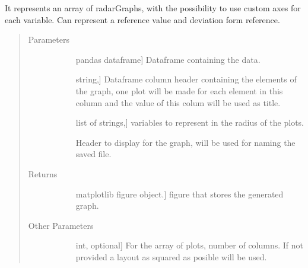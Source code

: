 \documentclass[letterpaper,10pt,english]{sphinxmanual}
\begin{document}
\begin{fulllineitems}
\label{\detokenize{rstFiles/radarArray:radarArray.radarArrayGraph}}
It represents an array of radarGraphs, 
with the possibility to use custom axes for each variable. 
Can represent a reference value and deviation form reference.
\begin{quote}\begin{description}
\item[{Parameters}] \leavevmode\begin{description}
\item[{}] \leavevmode{[}pandas dataframe{]}
Dataframe containing the data.

\item[{}] \leavevmode{[}string,{]}
Dataframe column header containing 
the elements of the graph, 
one plot will be made for each element in this column 
and the value of this colum will be used as title.

\item[{}] \leavevmode{[}list of strings,{]}
variables to represent in the radius of the plots.

\item[{}] \leavevmode
Header to display for the graph, 
will be used for naming the saved file.

\end{description}

\item[{Returns}] \leavevmode\begin{description}
\item[{}] \leavevmode{[}matplotlib figure object.{]}
figure that stores the generated graph.

\end{description}

\item[{Other Parameters}] \leavevmode\begin{description}
\item[{}] \leavevmode{[}int, optional{]}
For the array of plots, number of columns. 
If not provided a layout as squared as posible will be used.


\end{description}
\end{description}
\end{quote}
\end{fulllineitems}
\end{document}
